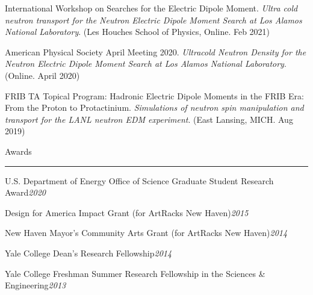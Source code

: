 \begin{singlespace}
{\vspace{\baselineskip}

International Workshop on Searches for the Electric Dipole Moment. \textit{Ultra cold neutron transport for the Neutron Electric Dipole Moment Search at Los Alamos National Laboratory}. (Les Houches School of Physics, Online. Feb 2021)

\vspace{\baselineskip}

American Physical Society April Meeting 2020. \textit{Ultracold Neutron Density for the Neutron Electric Dipole Moment Search at Los Alamos National Laboratory}. (Online. April 2020)

\vspace{\baselineskip}

FRIB TA Topical Program: Hadronic Electric Dipole Moments in the FRIB Era: From the Proton to Protactinium. \textit{Simulations of neutron spin manipulation and transport for the LANL neutron EDM experiment}. (East Lansing, MICH. Aug 2019) 

\vspace{\baselineskip}
{\large Awards}\vspace{0.25\baselineskip}\hrule\vspace{0.75\baselineskip}

U.S. Department of Energy Office of Science Graduate Student Research Award\hfill\textit{2020}

\vspace{0.25\baselineskip}

Design for America Impact Grant (for ArtRacks New Haven)\hfill\textit{2015}

\vspace{0.25\baselineskip}

New Haven Mayor's Community Arts Grant (for ArtRacks New Haven)\hfill\textit{2014}

\vspace{0.25\baselineskip}

Yale College Dean's Research Fellowship\hfill\textit{2014}

\vspace{0.25\baselineskip}

Yale College Freshman Summer Research Fellowship in the Sciences \& Engineering\hfill\textit{2013}


} %
\end{singlespace}
